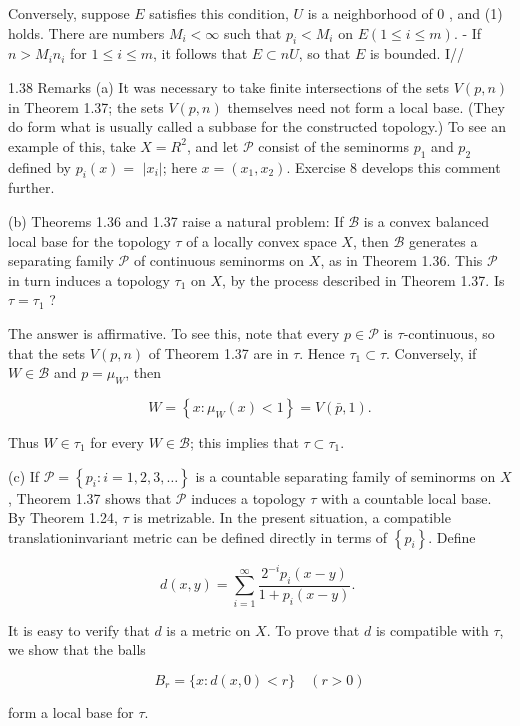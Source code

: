 \documentclass[10pt]{article}
\begin{document}
Conversely, suppose $E$ satisfies this condition, $U$ is a neighborhood of 0 , and (1) holds. There are numbers $M_{i}<\infty$ such that $p_{i}<M_{i}$ on $E(1 \leq i \leq m)$. - If $n>M_{i} n_{i}$ for $1 \leq i \leq m$, it follows that $E \subset n U$, so that $E$ is bounded. I//

1.38 Remarks (a) It was necessary to take finite intersections of the sets $V(p, n)$ in Theorem 1.37; the sets $V(p, n)$ themselves need not form a local base. (They do form what is usually called a subbase for the constructed topology.) To see an example of this, take $X=R^{2}$, and let $\mathscr{P}$ consist of the seminorms $p_{1}$ and $p_{2}$ defined by $p_{i}(x)=$ $\left|x_{i}\right|$; here $x=\left(x_{1}, x_{2}\right)$. Exercise 8 develops this comment further.

(b) Theorems 1.36 and 1.37 raise a natural problem: If $\mathscr{B}$ is a convex balanced local base for the topology $\tau$ of a locally convex space $X$, then $\mathscr{B}$ generates a separating family $\mathscr{P}$ of continuous seminorms on $X$, as in Theorem 1.36. This $\mathscr{P}$ in turn induces a topology $\tau_{1}$ on $X$, by the process described in Theorem 1.37. Is $\tau=\tau_{1}$ ?

The answer is affirmative. To see this, note that every $p \in \mathscr{P}$ is $\tau$-continuous, so that the sets $V(p, n)$ of Theorem 1.37 are in $\tau$. Hence $\tau_{1} \subset \tau$. Conversely, if $W \in \mathscr{B}$ and $p=\mu_{W}$, then

$$
W=\left\{x: \mu_{W}(x)<1\right\}=V(\bar{p}, 1) .
$$

Thus $W \in \tau_{1}$ for every $W \in \mathscr{B}$; this implies that $\tau \subset \tau_{1}$.

(c) If $\mathscr{P}=\left\{p_{i}: i=1,2,3, \ldots\right\}$ is a countable separating family of seminorms on $X$, Theorem 1.37 shows that $\mathscr{P}$ induces a topology $\tau$ with a countable local base. By Theorem 1.24, $\tau$ is metrizable. In the present situation, a compatible translationinvariant metric can be defined directly in terms of $\left\{p_{i}\right\}$. Define

$$
d(x, y)=\sum_{i=1}^{\infty} \frac{2^{-i} p_{i}(x-y)}{1+p_{i}(x-y)} \text {. }
$$

It is easy to verify that $d$ is a metric on $X$. To prove that $d$ is compatible with $\tau$, we show that the balls

$$
B_{r}=\{x: d(x, 0)<r\} \quad(r>0)
$$

form a local base for $\tau$.
\end{document}
